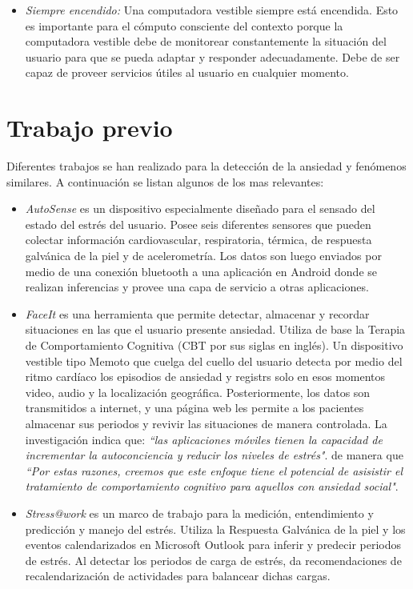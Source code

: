\documentclass[letterpaper,12pt]{cicese}
\begin{document}
				\begin{itemize}
					\item{\emph{Siempre encendido:}} Una computadora vestible siempre est\'a encendida. Esto es importante para el c\'omputo consciente del contexto
					porque la computadora vestible debe de monitorear constantemente la situaci\'on del usuario para que se pueda adaptar y responder
					adecuadamente. Debe de ser capaz de proveer servicios \'utiles al usuario en cualquier momento.
				\end{itemize}

		\chapter{Trabajo previo}
				Diferentes trabajos se han realizado para la detecci\'on de la ansiedad y fen\'omenos similares. A continuaci\'on se listan algunos de los mas relevantes:
				\begin{itemize}
					\item{\emph{AutoSense}\citep{Ertin2011}} es un dispositivo especialmente dise\~nado para el sensado del estado del estr\'es del usuario. Posee seis diferentes
					sensores que pueden colectar informaci\'on cardiovascular, respiratoria, t\'ermica, de respuesta galv\'anica de la piel y de acelerometr\'ia. Los
					datos son luego enviados por medio de una conexi\'on bluetooth a una aplicaci\'on en Android donde se realizan inferencias y provee una capa de 
					servicio a otras aplicaciones.
		
					\item{\emph{FaceIt}\citep{Rennert2013}} es una herramienta que permite detectar, almacenar y recordar situaciones en las que el usuario presente ansiedad. Utiliza
					de base la Terapia de Comportamiento Cognitiva (CBT por sus siglas en ingl\'es). Un dispositivo vestible tipo Memoto que cuelga del cuello del usuario
					detecta por medio del ritmo card\'iaco los episodios de ansiedad y registrs solo en esos momentos video, audio y la localizaci\'on geogr\'afica. Posteriormente,
					los datos son transmitidos a internet, y una p\'agina web les permite a los pacientes almacenar sus periodos y revivir las situaciones de manera
					controlada. La investigaci\'on indica que: \emph{``las aplicaciones m\'oviles tienen la capacidad de incrementar
					la autoconciencia y reducir los niveles de estr\'es"}. de manera que \emph{``Por estas razones, creemos que este enfoque tiene el potencial de asisistir
					el tratamiento de comportamiento cognitivo para aquellos con ansiedad social"}.

					\item{\emph{Stress@work}\citep{Bakker2012SMS}} es un marco de trabajo para la medici\'on, entendimiento y predicci\'on y manejo del estr\'es. Utiliza la Respuesta
					Galv\'anica de la piel y los eventos calendarizados en Microsoft Outlook para inferir y predecir periodos de estr\'es. Al detectar los periodos de
					carga de estr\'es, da recomendaciones de recalendarizaci\'on de actividades para balancear dichas cargas.
				\end{itemize}
\end{document}
